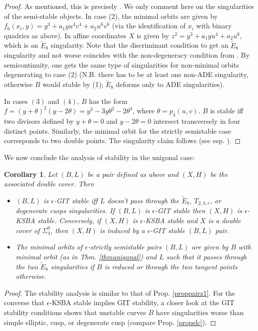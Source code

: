 \documentclass{amsart}
\numberwithin{equation}{section}
\theoremstyle{plain}
\newtheorem{corollary}[equation]{Corollary}
\theoremstyle{remark}
\theoremstyle{definition}
\newcommand{\Ee}{\widetilde{E}_8}
\begin{document}
\begin{proof}
As mentioned, this is precisely  \cite[Thm 4.3]{shah}. We only comment here on the singularities of the semi-stable objects. In case (2), the minimal orbits are given by 
$f_6(x_i,y)=y^3+ a_1y u^4v^4+ a_2u^6v^6$
(via the identification of $x_i$ with binary quadrics as above). In affine coordinates $X$ is given by $z^2=y^3+a_1yu^4+a_2u^6$, which is an $\Ee$ singularity. Note that the discriminant condition to get an $\Ee$ singularity and not worse coincides with the non-degeneracy condition from \cite[Thm 4.3]{shah}. By semicontinuity, one gets the same type of singularities for non-minimal orbits degenerating to  case (2) (N.B. there has to be at least one non-ADE singularity, otherwise $B$ would stable by (1); $\Ee$ deforms only to ADE singularities). 


In cases $(3)$ and $(4)$, $B$ has the form $f= (y+\theta)^2( y-2 \theta) = y^3- 3 y \theta^2- 2 \theta^3$, where $\theta= p_4(u, v)$.  $B$ is stable iff  two divisors defined by $y+ \theta=0$ and $y-2 \theta=0$ intersect transversely in four distinct points. Similarly, the minimal orbit for the strictly semistable case corresponds to two double points. The singularity claim follows (see esp. \cite[\S16.2.9]{agzv1}). 
\end{proof}

We now conclude the analysis of stability in the unigonal case:\begin{corollary}\label{corunigonal}
Let $(B, L)$ be a pair defined as above and $(X, H)$ be the associated double cover. Then
\begin{itemize}
\item[(1)] $(B, L)$ is $\epsilon$-GIT stable iff $L$ doesn't pass through the $\Ee$, $T_{2,3,r}$, or degenerate cusps singularities. If   $(B, L)$ is $\epsilon$-GIT stable then $(X,H)$ is $\epsilon$-KSBA stable. Conversely, if $(X,H)$ is $\epsilon$-KSBA stable and $X$ is a double cover of $\Sigma_4^0$, then $(X,H)$ is induced by a $\epsilon$-GIT stable $(B, L)$ pair.  
\item[(2)] The minimal orbits of  $\epsilon$-strictly semistable pairs $(B, L)$ 
are given by $B$ with minimal orbit (as in Thm. \ref{thmunigonal}) and $L$ such that it passes through the  two $\Ee$ singularities if $B$ is reduced or through the two tangent points otherwise. 
\end{itemize}
\end{corollary}
\begin{proof}
The stability analysis is similar to that of Prop. \ref{proppairz1}. For the converse that  $\epsilon$-KSBA stable implies GIT stability, a closer look at the GIT stability conditions shows that unstable curves $B$ have singularities worse than simple elliptic, cusp, or degenerate cusp (compare Prop. \ref{propslc}).
\end{proof}
\end{document}
